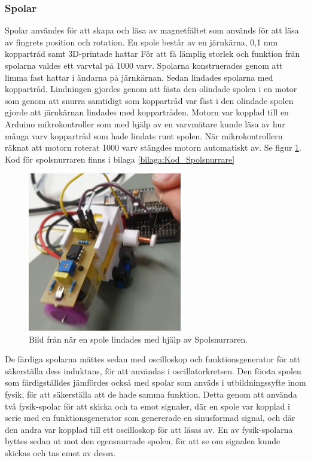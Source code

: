 \documentclass[a4paper]{article}
\begin{document}
\begin{sloppypar}
   

    \subsubsection{Spolar}
    Spolar användes för att skapa och läsa av magnetfältet som används för att läsa av fingrets position och rotation.
    En spole består av en järnkärna, 0,1 mm koppartråd samt 3D-printade hattar
    För att få lämplig storlek och funktion från spolarna valdes ett varvtal på 1000 varv.
    Spolarna konstruerades genom att limma fast hattar i ändarna på järnkärnan.
    Sedan lindades spolarna med koppartråd.
    Lindningen gjordes genom att fästa den olindade spolen i en motor som genom att snurra samtidigt som koppartråd
    var fäst i den olindade spolen gjorde att järnkärnan lindades med koppartråden.
    Motorn var kopplad till en Arduino mikrokontroller som med hjälp av en varvmätare kunde läsa av hur många varv
    koppartråd som hade lindats runt spolen.
    När mikrokontrollern räknat att motorn roterat 1000 varv stängdes motorn automatiskt av. Se figur \ref{fig:Spolsnurrare}.
    Kod för spolsnurraren finns i bilaga \ref{bilaga:Kod_Spolsnurrare}

    \begin{figure}[H]
        \centering
        \includegraphics[width=0.6\textwidth]{spolsnurrare1.png}
        \caption{Bild från när en spole lindades med hjälp av Spolsnurraren.}
        \label{fig:Spolsnurrare}
    \end{figure}

    De färdiga spolarna mättes sedan med oscilloskop och funktionsgenerator för att säkerställa dess induktans, för att användas i oscillatorkretsen.
    Den första spolen som färdigställdes jämfördes också med spolar som anväds i utbildningssyfte inom fysik, för att säkerställa att de hade samma funktion.
    Detta genom att använda två fysik-spolar för att skicka och ta emot signaler, där en spole var kopplad i serie med en funktionsgenerator som genererade en sinusformad signal, och där den andra var kopplad till ett oscilloskop för att läsas av.
    En av fysik-spolarna byttes sedan ut mot den egensnurrade spolen, för att se om signalen kunde skickas och tas emot av dessa.


\end{sloppypar}
\end{document}
